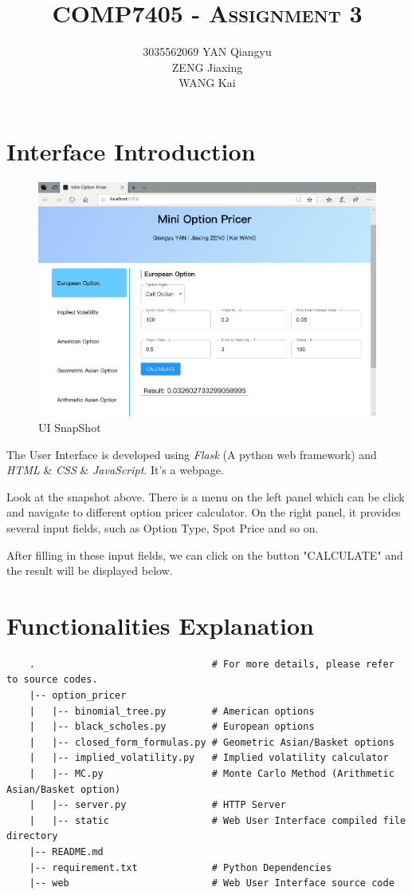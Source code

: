 \documentclass[11pt,a4paper]{article}
\title{\textsc{COMP7405 - Assignment 3}}
\author{	3035562069 YAN Qiangyu\\
                ZENG Jiaxing \\
                WANG Kai
            }
\date{}
\begin{document}
    \maketitle

    \section{Interface Introduction}
    
    \begin{figure}[h]
    \centering
    \includegraphics[width=\linewidth]{snapshot1}
    \caption{UI SnapShot}
    \end{figure}

    The User Interface is developed using 
    \emph{Flask} (A python web framework) 
    and \emph{HTML} \& \emph{CSS} \& \emph{JavaScript}. 
    It's a webpage.
    

    Look at the snapshot above. There is a menu on the left panel which can
    be click and navigate to different option pricer calculator. On the
    right panel, it provides several input fields, such as Option Type, Spot
    Price and so on.

    After filling in these input fields, we can click on the button
    "CALCULATE" and the result will be displayed below.

    \newpage
    \section{Functionalities Explanation}
    \begin{verbatim}
    .                               # For more details, please refer to source codes.
    |-- option_pricer
    |   |-- binomial_tree.py        # American options
    |   |-- black_scholes.py        # European options
    |   |-- closed_form_formulas.py # Geometric Asian/Basket options
    |   |-- implied_volatility.py   # Implied volatility calculator
    |   |-- MC.py                   # Monte Carlo Method (Arithmetic Asian/Basket option)
    |   |-- server.py               # HTTP Server
    |   |-- static                  # Web User Interface compiled file directory
    |-- README.md
    |-- requirement.txt             # Python Dependencies
    |-- web                         # Web User Interface source code
    \end{verbatim}
\end{document}
